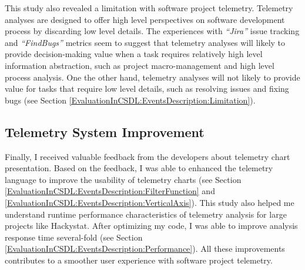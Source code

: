 This study also revealed a limitation with software project telemetry. Telemetry analyses are designed to offer high level perspectives on software development process by discarding low level details. The experiences with \textit{``Jira''} issue tracking and \textit{``FindBugs''} metrics seem to suggest that telemetry analyses will likely to provide decision-making value when a task requires relatively high level information abstraction, such as project macro-management and high level process analysis. One the other hand, telemetry analyses will not likely to provide value for tasks that require low level details, such as resolving issues and fixing bugs (see Section \ref{EvaluationInCSDL:EventsDescription:Limitation}).





\subsection{Telemetry System Improvement}

Finally, I received valuable feedback from the developers about telemetry chart presentation. Based on the feedback, I was able to enhanced the telemetry language to improve the usability of telemetry charts (see Section \ref{EvaluationInCSDL:EventsDescription:FilterFunction} and \ref{EvaluationInCSDL:EventsDescription:VerticalAxis}).
This study also helped me understand runtime performance characteristics of telemetry analysis for large projects like Hackystat. After optimizing my code, I was able to improve analysis response time several-fold (see Section \ref{EvaluationInCSDL:EventsDescription:Performance}).  
All these improvements contributes to a smoother user experience with software project telemetry. 





